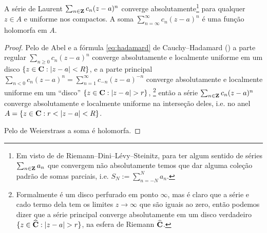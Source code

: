 \begin{teorema}
\label{t:laurent-anel}
A série de Laurent $\sum_{n\in\mathbf{Z}} c_n (z-a)^n$
converge absolutamente\footnote{Em visto de 
de Riemann--Dini--Lévy--Steinitz,
para ter algum sentido de séries $\sum_{n\in\mathbf{Z}} a_n$ que convergem
não absolutamente temos que dar alguma coleção padrão
de somas parciais, i.e. $S_N := \sum_{n=-N}^N a_n$.}
para qualquer $z\in A$ e uniforme nos compactos.
A soma $\sum_{n=\infty}^\infty c_n (z-a)^n$ é uma função holomorfa em $A$.
\end{teorema}
\begin{proof}
Pelo  de Abel e a fórmula \eqref{eq:hadamard} de Cauchy--Hadamard ()
a parte regular $\sum_{n\geq 0} c_n (z-a)^n$
converge absolutamente e localmente uniforme 
em um disco $\{z\in\mathbf{C} : |z-a| < R \}$,
e a parte principal $\sum_{n<0} c_n (z-a)^n = \sum_{n=1}^\infty c_{-n} (z-a)^{-n}$
converge absolutamente e localmente uniforme 
em um ``disco'' $\{ z\in\mathbf{C} : |z-a| > r \}$,
\footnote{Formalmente é um disco perfurado em ponto $\infty$,
mas é claro que a série e cado termo dela
tem os limites $z\to\infty$ que são iguais ao zero,
então podemos dizer que a série principal converge absolutamente
em um disco verdadeiro $\{z\in\widehat{\mathbf{C}} : |z-a| > r \}$,
na esfera de Riemann $\widehat{\mathbf{C}}$.}
então a série $\sum_{n\in\mathbf{Z}} c_n (z-a)^n$
converge absolutamente e localmente uniforme 
na interseção deles, i.e. no anel $A = \{ z\in\mathbf{C} : r < |z-a| < R \}$.

Pelo  de Weierstrass a soma é holomorfa.
\end{proof}


